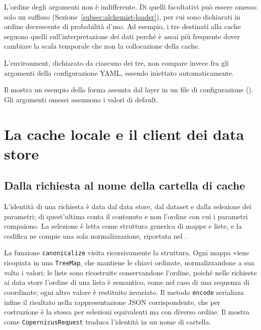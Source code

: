 L'ordine degli argomenti non è indifferente. Di quelli facoltativi può essere omesso solo un
suffisso (Sezione~\ref{subsec:alchemist-loader}), per cui sono dichiarati in ordine
decrescente di probabilità d'uso. Ad esempio, i tre destinati alla cache seguono quelli
sull'interpretazione dei dati perché è assai più frequente dover cambiare la scala temporale
che non la collocazione della cache.

L'environment, dichiarato da ciascuno dei tre, non compare invece fra gli argomenti della
configurazione YAML, essendo iniettato automaticamente.

Il  mostra un esempio della forma assunta dal layer in un file di configurazione ().
Gli argomenti omessi assumono i valori di default.

\section{La cache locale e il client dei data store}
\label{sec:acquisizione-impl}

\subsection{Dalla richiesta al nome della cartella di cache}
\label{subsec:nome-cartella-impl}

L'identità di una richiesta è
data dal data store, dal dataset e dalla selezione dei parametri; di quest'ultima conta
il contenuto e non l'ordine con cui i parametri compaiono. La selezione è
letta come struttura generica di mappe e liste, e la codifica ne compie una sola
normalizzazione, riportata nel .



La funzione \texttt{canonicalize} visita ricorsivamente la struttura. Ogni mappa viene
ricopiata in una \texttt{TreeMap}, che mantiene le chiavi ordinate, normalizzandone a sua
volta i valori; le liste sono ricostruite conservandone l'ordine, poiché nelle richieste
ai data store l'ordine di una
lista è semantico, come nel caso di una sequenza di coordinate; ogni altro
valore è restituito invariato. Il metodo \texttt{encode} serializza infine il risultato nella rappresentazione
JSON corrispondente, che per
costruzione è la stessa per selezioni equivalenti ma con diverso ordine.
Il  mostra come \texttt{CopernicusRequest} traduca l'identità in un nome
di cartella.

